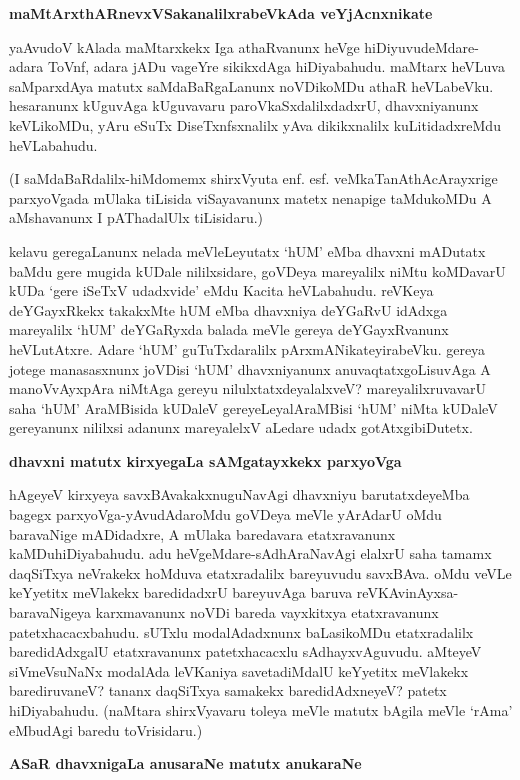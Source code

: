 {\bigskip
\noindent
{\large\bf maMtArxthARnevxVSakanalilxrabeVkAda veYjAcnxnikate}}\label{page119}
\medskip

\noindent
yaAvudoV kAlada maMtarxkekx Iga athaRvanunx heVge hiDiyuvudeMdare-adara ToVnf, adara jADu vageYre sikikxdAga hiDiyabahudu. maMtarx heVLuva saMparxdAya matutx saMdaBaRgaLanunx noVDikoMDu athaR heVLabeVku. hesaranunx kUguvAga kUguvavaru paroVkaSxdalilxdadxrU, dhavxniyanunx keVLikoMDu, yAru eSuTx DiseTxnfsxnalilx yAva dikikxnalilx kuLitidadxreMdu heVLabahudu.

(I saMdaBaRdalilx-hiMdomemx shirxVyuta enf. esf. veMkaTanAthAcArayxrige 
parxyoVgada mUlaka tiLisida viSayavanunx matetx nenapige taMdukoMDu A aMshavanunx I pAThadalUlx tiLisidaru.)

kelavu geregaLanunx nelada meVleLeyutatx `hUM' eMba dhavxni mADutatx 
baMdu gere mugida kUDale nililxsidare, goVDeya mareyalilx niMtu 
koMDavarU kUDa `gere iSeTxV udadxvide' eMdu Kacita heVLabahudu. reVKeya 
deYGayxRkekx takakxMte hUM eMba dhavxniya deYGaRvU idAdxga mareyalilx `hUM' deYGaRyxda balada meVle gereya deYGayxRvanunx heVLutAtxre. Adare `hUM' guTuTxdaralilx pArxmANikateyirabeVku. gereya jotege manasasxnunx joVDisi `hUM' dhavxniyanunx anuvaqtatxgoLisuvAga A manoVvAyxpAra niMtAga gereyu nilulxtatxdeyalalxveV? mareyalilxruvavarU saha `hUM' AraMBisida kUDaleV gereyeLeyalAraMBisi `hUM' niMta kUDaleV gereyanunx nililxsi adanunx mareyalelxV aLedare udadx gotAtxgibiDutetx.

{\bigskip
\noindent
{\large\bf dhavxni matutx kirxyegaLa sAMgatayxkekx parxyoVga}}\label{page120}
\medskip

\noindent
hAgeyeV kirxyeya savxBAvakakxnuguNavAgi dhavxniyu barutatxdeyeMba 
bagegx parxyoVga-yAvudAdaroMdu goVDeya meVle yArAdarU oMdu baravaNige 
mADidadxre, A mUlaka baredavara etatxravanunx kaMDuhiDiyabahudu. adu heVgeMdare-sAdhAraNavAgi elalxrU saha tamamx daqSiTxya neVrakekx hoMduva etatxradalilx bareyuvudu savxBAva. oMdu veVLe keYyetitx meVlakekx baredidadxrU bareyuvAga baruva reVKAvinAyxsa-baravaNigeya karxmavanunx noVDi bareda vayxkitxya etatxravanunx patetxhacacxbahudu. sUTxlu modalAdadxnunx baLasikoMDu etatxradalilx baredidAdxgalU etatxravanunx patetxhacacxlu sAdhayxvAguvudu. aMteyeV siVmeVsuNaNx modalAda leVKaniya savetadiMdalU keYyetitx meVlakekx barediruvaneV? tananx daqSiTxya samakekx baredidAdxneyeV? patetx hiDiyabahudu. (naMtara shirxVyavaru toleya meVle matutx bAgila meVle `rAma' eMbudAgi baredu toVrisidaru.)
  
  {\bigskip
\noindent
{\large\bf ASaR dhavxnigaLa anusaraNe matutx anukaraNe}}\label{page120a}
\medskip

